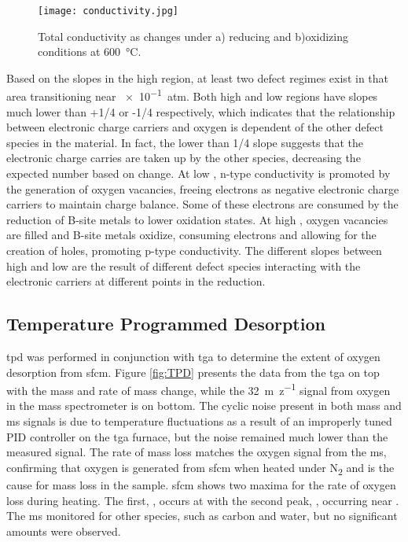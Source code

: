     \begin{figure}
      \texttt{[image: conductivity.jpg]}
      \caption{Total conductivity as  changes under a) reducing and b)oxidizing conditions at \SI{600}{\celsius}.}
      \label{fig:conductivity}
    \end{figure}

    Based on the slopes in the high  region, at least two defect regimes exist in that area transitioning near \SI{e-1}{atm}.
    Both high and low  regions have slopes much lower than +1/4 or -1/4 respectively, which indicates that the relationship between electronic charge carriers and oxygen is dependent of the other defect species in the material.
    In fact, the lower than 1/4 slope suggests that the electronic charge carries are taken up by the other species, decreasing the expected number based on  change.
    At low , n-type conductivity is promoted by the generation of oxygen vacancies, freeing electrons as negative electronic charge carriers to maintain charge balance.
    Some of these electrons are consumed by the reduction of B-site metals to lower oxidation states.
    At high , oxygen vacancies are filled and B-site metals oxidize, consuming electrons and allowing for the creation of holes, promoting p-type conductivity.
    The different slopes between high and low  are the result of different defect species interacting with the electronic carriers at different points in the reduction.

    \subsection{Temperature Programmed Desorption}
    \Gls{tpd} was performed in conjunction with \gls{tga} to determine the extent of oxygen desorption from \gls{sfcm}.
    Figure \ref{fig:TPD} presents the data from the \gls{tga} on top with the mass and rate of mass change, while the \SI{32}{m\per z} signal from oxygen in the mass spectrometer is on bottom.
    The cyclic noise present in both mass and \gls{ms} signals is due to temperature fluctuations as a result of an improperly tuned PID controller on the \gls{tga} furnace, but the noise remained much lower than the measured signal.
    The rate of mass loss matches the oxygen signal from the \gls{ms}, confirming that oxygen is generated from \gls{sfcm} when heated under N\textsubscript{2} and is the cause for mass loss in the sample.
    \gls{sfcm} shows two maxima for the rate of oxygen loss during heating.
    The first, \textalpha, occurs at  with the second peak, \textbeta, occurring near .
    The \gls{ms} monitored for other species, such as carbon and water, but no significant amounts were observed.


